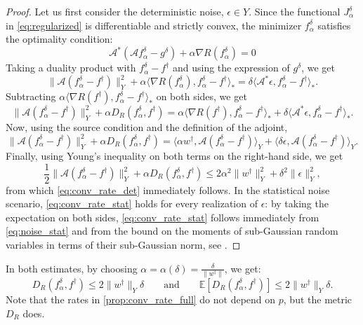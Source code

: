 \documentclass[11pt,a4paper]{article}
\numberwithin{equation}{section}
\newcommand{\cA}{\mathscr{A}}
\newcommand{\E}{\mathbb{E}}
\def\fda{f^\delta_{\alpha}}
\def\Jda{J^\delta_{\alpha}}
\def\gd{{g}^{\delta}}
\begin{document}
\begin{proof}
Let us first consider the deterministic noise, $\epsilon \in Y$. Since the functional $\Jda$ in \eqref{eq:regularized} is differentiable and strictly convex, the minimizer $\fda$ satisfies the optimality condition:
\[
\cA^*(\cA \fda - \gd) + \alpha \nabla R(\fda) = 0
\]
Taking a duality product with $\fda - f^\dag$ and using the expression of $\gd$, we get
\[
\| \cA (\fda - f^\dag)\|_Y^2 + \alpha \langle \nabla R(\fda), \fda - f^\dag \rangle_* = \delta \langle \cA^* \epsilon, \fda - f^\dag \rangle_*.
\]
Subtracting $\alpha\langle \nabla R(f^\dag), \fda - f^\dag \rangle_*$ on both sides, we get
\[
\| \cA (\fda - f^\dag)\|_Y^2 + \alpha D_R(\fda,f^\dag) = \alpha\langle \nabla R(f^\dag), \fda - f^\dag \rangle_* + \delta \langle \cA^* \epsilon, \fda - f^\dag \rangle_*.
\]
Now, using the source condition and the definition of the adjoint,
\[
\| \cA (\fda - f^\dag)\|_Y^2 + \alpha D_R(\fda,f^\dag) =\langle \alpha w^\dag, \cA (\fda - f^\dag) \rangle_Y + \langle \delta \epsilon, \cA(\fda - f^\dag) \rangle_Y.
\]
Finally, using Young's inequality on both terms on the right-hand side, we get
\begin{equation}
\frac{1}{2}\| \cA (\fda - f^\dag)\|_Y^2 + \alpha D_R(\fda,f^\dag) \leq 2 \alpha^2 \| w^\dag \|_Y^2 + \delta^2 \| \epsilon \|_Y^2,
    \label{eq:final}
\end{equation}
from which \eqref{eq:conv_rate_det} immediately follows. 
In the statistical noise scenario, \eqref{eq:conv_rate_stat} holds for every realization of $\epsilon$: by taking the expectation on both sides, \eqref{eq:conv_rate_stat} follows immediately from \eqref{eq:noise_stat} and from the bound on the moments of sub-Gaussian random variables in terms of their sub-Gaussian norm, see \cite[Proposition 2.5.2]{vershynin2018high}.
\end{proof}
In both estimates, by choosing $\alpha = \alpha(\delta) = \frac{\delta}{\| w^\dag \|}$, we get:
\begin{equation}\label{eq:conv_rate_full}
D_R(\fda,f^\dag)\leq 2 \| w^\dag\|_Y \delta
\qquad \text{and} \qquad \E[D_R(\fda,f^\dag)] \leq 2 \| w^\dag\|_Y \delta.    
\end{equation}
Note that the rates in \cref{prop:conv_rate_full} do not depend on $p$, but the metric $D_R$ does.
\end{document}

